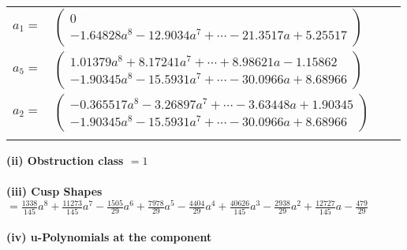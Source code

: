 \documentclass[1p]{elsarticle_modified}
\theoremstyle{definition}
\begin{document}
\begin{tabular}{m{7pt} m{180pt} m{7pt} m{180pt} }
\flushright $a_{1}=$&$\begin{pmatrix}0\\-1.64828 a^{8}-12.9034 a^{7}+\cdots-21.3517 a+5.25517\end{pmatrix}$ \\
\flushright $a_{5}=$&$\begin{pmatrix}1.01379 a^{8}+8.17241 a^{7}+\cdots+8.98621 a-1.15862\\-1.90345 a^{8}-15.5931 a^{7}+\cdots-30.0966 a+8.68966\end{pmatrix}$ \\
\flushright $a_{2}=$&$\begin{pmatrix}-0.365517 a^{8}-3.26897 a^{7}+\cdots-3.63448 a+1.90345\\-1.90345 a^{8}-15.5931 a^{7}+\cdots-30.0966 a+8.68966\end{pmatrix}$\\&\end{tabular}
\flushleft \textbf{(ii) Obstruction class $= 1$}\\~\\
\flushleft \textbf{(iii) Cusp Shapes $= \frac{1338}{145} a^8+\frac{11273}{145} a^7-\frac{1505}{29} a^6+\frac{7978}{29} a^5-\frac{4404}{29} a^4+\frac{40626}{145} a^3-\frac{2938}{29} a^2+\frac{12727}{145} a-\frac{479}{29}$}\\~\\
\newpage\renewcommand{\arraystretch}{1}
\flushleft \textbf{(iv) u-Polynomials at the component}\newline \\
\end{document}

